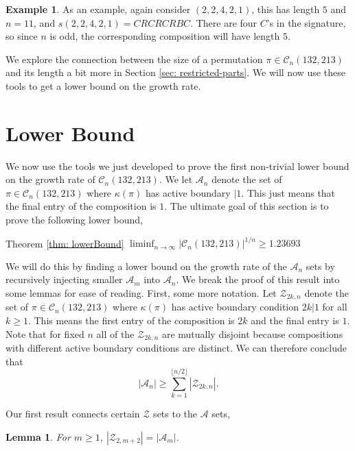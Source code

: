 \documentclass[11pt]{article}
\newcommand\A{\mathcal A}
\newcommand\cZ{\mathcal Z}
\newcommand\C{\mathcal C}
\newtheorem{lemma}[theorem]{Lemma}
\theoremstyle{definition}
\newtheorem{example}[theorem]{Example}
\newcommand{\thistheoremname}{}
\newtheorem*{genericthm*}{\thistheoremname}
\newenvironment{namedthm*}[1]
  {\renewcommand{\thistheoremname}{#1}%
   \begin{genericthm*}}
  {\end{genericthm*}}
\begin{document}
\begin{example}
  As an example, again consider $(2,2,4,2,1)$, this has length $5$ and $n = 11$, and $s(2,2,4,2,1) = CRCRCRBC$. There are four $C$'s in the signature, so since $n$ is odd, the corresponding composition will have length $5$. 
\end{example}
  
  We explore the connection between the size of a permutation $\pi \in \C_n(132,213)$ and its length a bit more in Section \ref{sec: restricted-parts}. We will now use these tools to get a lower bound on the growth rate.

\section{Lower Bound} \label{sec: lower-bound}

We now use the tools we just developed to prove the first non-trivial lower bound on the growth rate of $\C_n(132,213)$. We let $\A_n$ denote the set of $\pi \in \C_{n}(132,213)$ where $\kappa(\pi)$ has active boundary $|1$. This just means that the final entry of the composition is $1$. The ultimate goal of this section is to prove the following lower bound,

\begin{namedthm*}{Theorem \ref{thm: lowerBound}}
    $\liminf_{n \to \infty} |\C_{n}(132,213)|^{1/n} \geq  1.23693$
\end{namedthm*}

We will do this by finding a lower bound on the growth rate of the $\A_n$ sets by recursively injecting smaller $\A_m$ into $\A_n$. We break the proof of this result into some lemmas for ease of reading. First, some more notation. Let $\mathcal{Z}_{2k,n}$ denote the set of $\pi \in \C_{n}(132,213)$ where $\kappa(\pi)$ has active boundary condition $2k|1$ for all $k \geq 1$. This means the first entry of the composition is $2k$ and the final entry is $1$. Note that for fixed $n$ all of the $\cZ_{2k,n}$ are mutually disjoint because compositions with different active boundary conditions are distinct. We can therefore conclude that
\[
|\A_n| \ge \sum_{k=1}^{\lfloor n/2 \rfloor} |\cZ_{2k,n}|.
\]

Our first result connects certain $\cZ$ sets to the $\A$ sets,

\begin{lemma} \label{lem: A-to-Z2}
    For $m \ge 1$, $|\cZ_{2,m+2}| = |\A_{m}|$.
\end{lemma}
\end{document}
